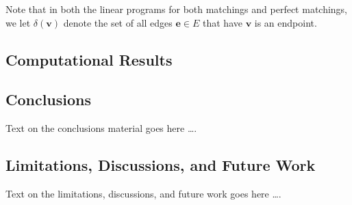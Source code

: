 \documentclass[12pt]{report} %
\begin{document}
Note that in both the linear programs for both matchings and perfect matchings, we let $\delta(\mathbf{v})$ denote the set of all edges $\mathbf{e} \in E$ that have $\mathbf{v}$ is an endpoint. 

\newpage 

\subsection*{Computational Results}



\newpage 


\subsection*{Conclusions}

Text on the conclusions material goes here \ldots. 

\newpage 

\subsection*{Limitations, Discussions, and Future Work}

Text on the limitations, discussions, and future work goes here \ldots. 

\newpage



\end{document}
